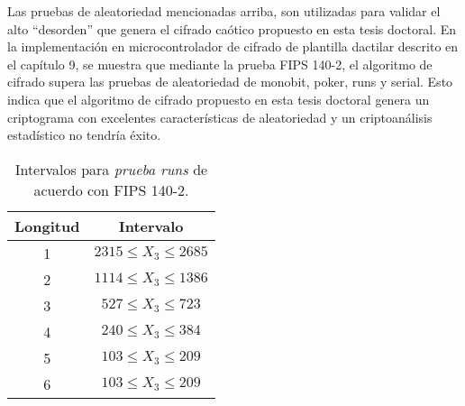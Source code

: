 Las pruebas de aleatoriedad mencionadas arriba, son utilizadas para validar el alto ``desorden'' que genera el cifrado caótico propuesto en esta tesis doctoral. En la implementación en microcontrolador de cifrado de plantilla dactilar descrito en el capítulo 9, se muestra que mediante la prueba FIPS 140-2, el algoritmo de cifrado supera las pruebas de aleatoriedad de monobit, poker, runs y serial. Esto indica que el algoritmo de cifrado propuesto en esta tesis doctoral genera un criptograma con excelentes características de aleatoriedad y un criptoanálisis estadístico no tendría éxito. 

\begin{table}[!htbp] %
	\center
	\begin{tabular}{c c} 
	\hline
	Longitud & Intervalo \\
	\hline
	1	&	$2315 \leq X_{3} \leq 2685$ \\
	2	&	$1114 \leq X_{3} \leq 1386$ \\	
	3	&	$527 \leq X_{3} \leq 723$ \\
	4	&	$240 \leq X_{3} \leq 384$ \\
	5	&	$103 \leq X_{3} \leq 209$ \\
	6	&	$103 \leq X_{3} \leq 209$ \\
	\hline
\end{tabular}
	\caption{Intervalos para \textit{prueba runs} de acuerdo con FIPS 140-2.}
\end{table}

